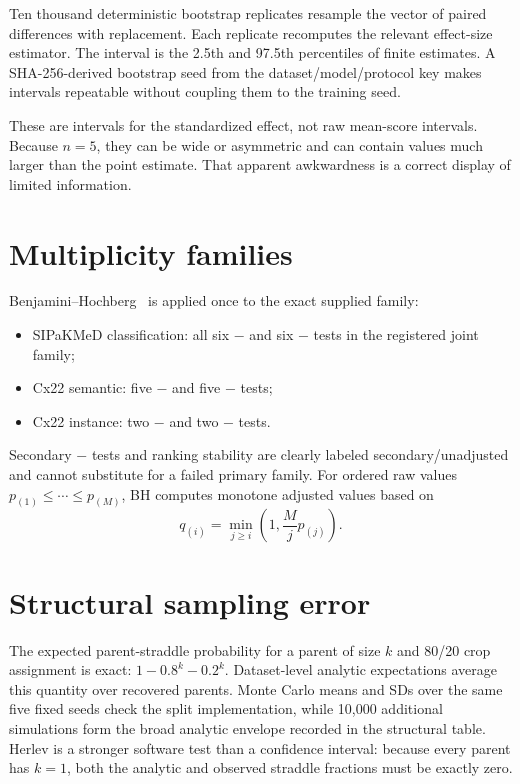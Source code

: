 Ten thousand deterministic bootstrap replicates resample the vector of paired differences with replacement. Each replicate recomputes the relevant effect-size estimator. The interval is the 2.5th and 97.5th percentiles of finite estimates. A SHA-256-derived bootstrap seed from the dataset/model/protocol key makes intervals repeatable without coupling them to the training seed.

These are intervals for the standardized effect, not raw mean-score intervals. Because $n=5$, they can be wide or asymmetric and can contain values much larger than the point estimate. That apparent awkwardness is a correct display of limited information.

\section{Multiplicity families}

Benjamini--Hochberg~\cite{benjamini1995fdr} is applied once to the exact supplied family:
\begin{itemize}
  \item SIPaKMeD classification: all six $-$ and six $-$ tests in the registered joint family;
  \item Cx22 semantic: five $-$ and five $-$ tests;
  \item Cx22 instance: two $-$ and two $-$ tests.
\end{itemize}
Secondary $-$ tests and ranking stability are clearly labeled secondary/unadjusted and cannot substitute for a failed primary family. For ordered raw values $p_{(1)}\leq\cdots\leq p_{(M)}$, BH computes monotone adjusted values based on
\begin{equation}
q_{(i)}=\min_{j\geq i}\left(1,\frac{M}{j}p_{(j)}\right).
\end{equation}

\section{Structural sampling error}

The expected parent-straddle probability for a parent of size $k$ and 80/20 crop assignment is exact: $1-0.8^k-0.2^k$. Dataset-level analytic expectations average this quantity over recovered parents. Monte Carlo means and SDs over the same five fixed seeds check the split implementation, while 10,000 additional simulations form the broad analytic envelope recorded in the structural table. Herlev is a stronger software test than a confidence interval: because every parent has $k=1$, both the analytic and observed straddle fractions must be exactly zero.


